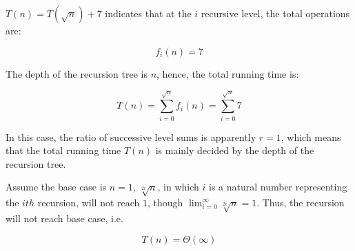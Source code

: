 \begin{homeworkProblem}
\begin{homeworkSubProblem}[$T(n)=T(\sqrt{n})+7$]
$T(n)=T(\sqrt{n})+7$ indicates that at the $i$ recursive level, the total operations are:

\begin{equation*}
f_i(n) = 7
\end{equation*}

The depth of the recursion tree is $n$, hence, the total running time is:

\[T(n) =\sum_{i=0}^{\sqrt{n}} f_i(n) = \sum_{i=0}^{\sqrt{n}} 7\]

In this case, the ratio of successive level sums is apparently $r = 1$, which means that the total running time $T(n)$ is mainly decided by the depth of the recursion tree.

Assume the base case is $n=1$, $\sqrt[2i]{n}$, in which $i$ is a natural number representing the $ith$ recursion, will not reach $1$, though $\lim_{i=0}^{\infty} \sqrt[2i]{n}= 1$. Thus, the recursion will not reach base case, i.e.

\begin{equation} \label{eq:6.6}
T(n) = \Theta(\infty)
\end{equation}

\end{homeworkSubProblem}

\end{homeworkProblem}
